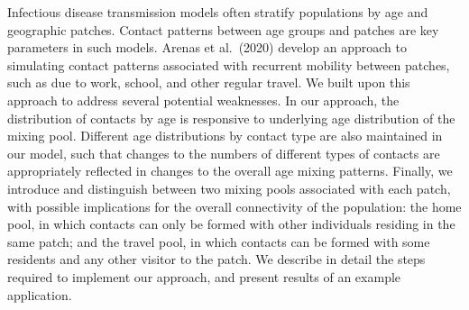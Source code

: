 Infectious disease transmission models often stratify populations by age and geographic patches.
Contact patterns between age groups and patches are key parameters in such models.
Arenas et al.\ (2020) develop an approach to simulating contact patterns associated with
recurrent mobility between patches, such as due to work, school, and other regular travel.
We built upon this approach to address several potential weaknesses.
In our approach, the distribution of contacts by age
is responsive to underlying age distribution of the mixing pool.
Different age distributions by contact type are also maintained in our model,
such that changes to the numbers of different types of contacts
are appropriately reflected in changes to the overall age mixing patterns.
Finally, we introduce and distinguish between two mixing pools associated with each patch,
with possible implications for the overall connectivity of the population:
the home pool, in which contacts can only be formed with other individuals residing in the same patch;
and the travel pool, in which contacts can be formed with some residents and any other visitor to the patch.
We describe in detail the steps required to implement our approach,
and present results of an example application.
